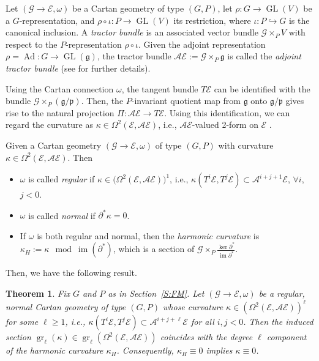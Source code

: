 \documentclass[pdftex]{sigma}%
\DeclareMathOperator{\gr}{gr}
\DeclareMathOperator{\img}{im}
\newcommand\GL{\operatorname{GL}}
\newcommand{\g}{\mathfrak{g}}
\newcommand\cG{\mathcal{G}}
\newcommand\Ad{\operatorname{Ad}}
\renewcommand\gr{\operatorname{gr}}
\newcommand\fp{\mathfrak{p}}
\newcommand\cA{\mathcal{A}}
\newcommand\cE{\mathcal{E}}
\numberwithin{equation}{section}
\newtheorem{Theorem}{Theorem}[section]
\begin{document}
\begin{Definition}
Let $(\cG \to \cE, \omega)$ be a Cartan geometry of type $(G,P)$, let $\rho\colon G \to \GL(V)$ be a $G$-representation, and $\rho \circ\iota\colon P \to \GL(V)$ its restriction, where $\iota \colon P \hookrightarrow G$ is the canonical inclusion. A {\em tractor bundle} is an associated vector bundle $\cG \times_P V$ with respect to the $P$-representation $\rho \circ \iota$. Given the adjoint representation $\rho = \Ad\colon G \to \GL(\g)$, the tractor bundle $\cA \cE := \cG \times_P \g$ is called the {\em adjoint tractor bundle} (see \cite[Section~1.5.7]{CS2009} for further details).
\end{Definition}

Using the Cartan connection $\omega$, the tangent bundle $T\cE$ can be identified with the bundle $\cG \times_P (\g/\fp) $. Then, the $P$-invariant quotient map from $\g$ onto $\g /\fp$ gives rise to the natural projection $\Pi\colon \cA \cE \to T\cE$. Using this identification, we can regard the curvature as $\kappa \in \Omega^2(\cE, \cA \cE)$, i.e., $\cA\cE$-valued 2-form on $\cE$ \cite[Proposition~1.5.7]{CS2009}.

\begin{Definition} \label{D:RN}
Given a Cartan geometry $(\cG \to \cE, \omega)$ of type $(G,P)$ with curvature $\kappa \in \Omega^2(\cE, \cA \cE)$. Then
\begin{itemize}\itemsep=0pt
\item [(a)] $\omega$ is called {\em regular} if $\kappa \in \bigl(\Omega^2(\cE, \cA \cE)\bigr)^1$, i.e., $\kappa(T^i\cE, T^j\cE) \subset \cA^{i+j+1}\cE$, $\forall i$, $j < 0$.
\item [(b)] $\omega$ is called {\it normal} if $\partial^\ast \kappa = 0$.
\item [(c)] If $\omega$ is both regular and normal, then the {\em harmonic curvature} is $\kappa_H := \kappa \mod \img(\partial^*)$, which is a section of $\cG \times_P \frac{\ker \partial^*}{\img \partial^*}$.
\end{itemize}
\end{Definition}
Then, we have the following result.

\begin{Theorem} \label{T:lh}
Fix $G$ and $P$ as in Section~{\rm \ref{S:FM}}. Let $(\cG \to \cE, \omega)$ be a regular, normal Cartan geometry of type $(G,P)$ whose curvature $\kappa \in \left(\Omega^2(\cE,\cA \cE)\right)^\ell$ for some $\ell \ge 1$, i.e., $\kappa \left(T^i\cE, T^j\cE\right) \subset \cA^{i+j+\ell}\cE$ for all $i,j <0$. Then the induced section $\gr_\ell (\kappa) \in \gr_\ell \left(\Omega^2(\cE,\cA \cE)\right)$ coincides with the degree $\ell$ component of the harmonic curvature $\kappa_H$. Consequently, $\kappa_H \equiv 0$ implies $\kappa \equiv 0$.
\end{Theorem}
\end{document}
